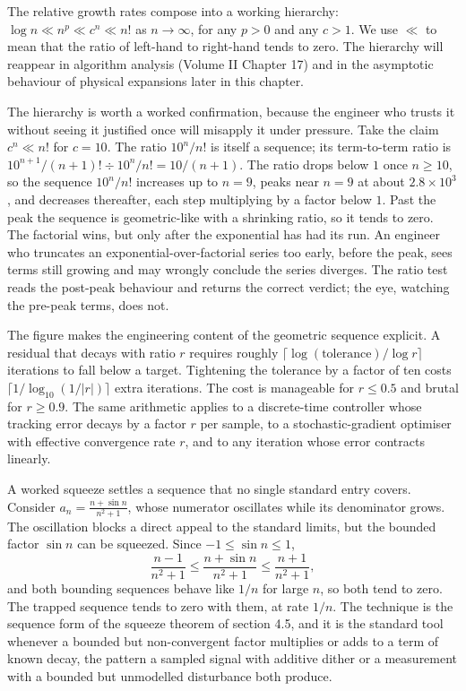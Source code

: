 The relative growth rates compose into a working hierarchy: $\log n
\ll n^{p} \ll c^{n} \ll n!$ as $n \to \infty$, for any $p > 0$ and any
$c > 1$. We use $\ll$ to mean that the ratio of left-hand to right-hand
tends to zero. The hierarchy will reappear in algorithm analysis
(Volume II Chapter 17) and in the asymptotic behaviour of physical
expansions later in this chapter.

The hierarchy is worth a worked confirmation, because the engineer who
trusts it without seeing it justified once will misapply it under
pressure. Take the claim $c^{n} \ll n!$ for $c = 10$. The ratio
$10^{n}/n!$ is itself a sequence; its term-to-term ratio is
$10^{n+1}/(n+1)! \div 10^{n}/n! = 10/(n+1)$. The ratio drops below $1$
once $n \geq 10$, so the sequence $10^{n}/n!$ increases up to $n = 9$,
peaks near $n = 9$ at about $2.8 \times 10^{3}$, and decreases
thereafter, each step multiplying by a factor below $1$. Past the peak
the sequence is geometric-like with a shrinking ratio, so it tends to
zero. The factorial wins, but only after the exponential has had its
run. An engineer who truncates an exponential-over-factorial series too
early, before the peak, sees terms still growing and may wrongly
conclude the series diverges. The ratio test reads the post-peak
behaviour and returns the correct verdict; the eye, watching the
pre-peak terms, does not.



The figure makes the engineering content of the geometric sequence
explicit. A residual that decays with ratio $r$ requires roughly
$\lceil \log(\text{tolerance}) / \log r \rceil$ iterations to fall
below a target. Tightening the tolerance by a factor of ten costs
$\lceil 1 / \log_{10}(1/|r|) \rceil$ extra iterations. The cost is
manageable for $r \leq 0.5$ and brutal for $r \geq 0.9$. The same
arithmetic applies to a discrete-time controller whose tracking
error decays by a factor $r$ per sample, to a stochastic-gradient
optimiser with effective convergence rate $r$, and to any iteration
whose error contracts linearly.

A worked squeeze settles a sequence that no single standard entry
covers. Consider $a_{n} = \frac{n + \sin n}{n^{2} + 1}$, whose numerator
oscillates while its denominator grows. The oscillation blocks a direct
appeal to the standard limits, but the bounded factor $\sin n$ can be
squeezed. Since $-1 \leq \sin n \leq 1$,
\[
\frac{n - 1}{n^{2} + 1} \leq \frac{n + \sin n}{n^{2} + 1} \leq
\frac{n + 1}{n^{2} + 1},
\]
and both bounding sequences behave like $1/n$ for large $n$, so both
tend to zero. The trapped sequence tends to zero with them, at rate
$1/n$. The technique is the sequence form of the squeeze theorem of
section 4.5, and it is the standard tool whenever a bounded but
non-convergent factor multiplies or adds to a term of known decay, the
pattern a sampled signal with additive dither or a measurement with a
bounded but unmodelled disturbance both produce.

